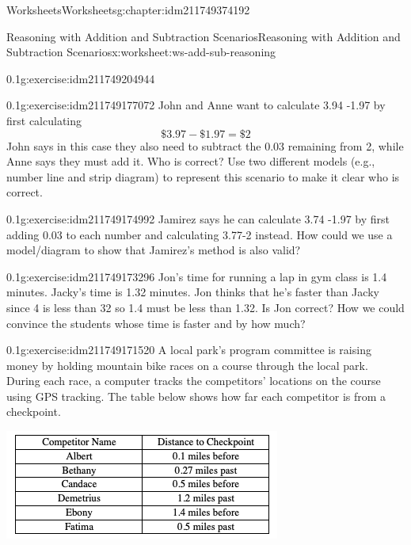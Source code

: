 \documentclass[twoside,11pt,]{book}
\begin{document}
\begin{chapterptx}{Worksheets}{}{Worksheets}{}{}{g:chapter:idm211749374192}
\begin{worksheet-section-numberless}{Reasoning with Addition and Subtraction Scenarios}{}{Reasoning with Addition and Subtraction Scenarios}{}{}{x:worksheet:ws-add-sub-reasoning}
\begin{divisionexercise}{1}{}{0.1}{g:exercise:idm211749204944}
\end{divisionexercise}%
\begin{divisionexercise}{2}{}{0.1}{g:exercise:idm211749177072}%
John and Anne want to calculate \textdollar{}3.94 -\textdollar{}1.97 by first calculating%
\begin{equation*}
\$3.97-\$1.97 = \$2 
\end{equation*}
John says in this case they also need to subtract the \textdollar{}0.03 remaining from \textdollar{}2, while Anne says they must add it.  Who is correct?  Use two different models (e.g., number line and strip diagram) to represent this scenario to make it clear who is correct.%
\end{divisionexercise}%
\begin{divisionexercise}{3}{}{0.1}{g:exercise:idm211749174992}%
Jamirez says he can calculate \textdollar{}3.74 -\textdollar{}1.97 by first adding \textdollar{}0.03 to each number and calculating \textdollar{}3.77-\textdollar{}2 instead.  How could we use a model\slash{}diagram to show that Jamirez’s method is also valid?%
\end{divisionexercise}%
\begin{divisionexercise}{4}{}{0.1}{g:exercise:idm211749173296}%
Jon’s time for running a lap in gym class is 1.4 minutes.  Jacky’s time is 1.32 minutes.  Jon thinks that he’s faster than Jacky since 4 is less than 32 so 1.4 must be less than 1.32.  Is Jon correct?  How we could convince the students whose time is faster and by how much?%
\end{divisionexercise}%
\begin{divisionexercise}{5}{}{0.1}{g:exercise:idm211749171520}%
A local park’s program committee is raising money by holding mountain bike races on a course through the local park.  During each race, a computer tracks the competitors’ locations on the course using GPS tracking.  The table below shows how far each competitor is from a checkpoint.%
\begin{sidebyside}{1}{0.05}{0.05}{0}%
\begin{sbspanel}{0.9}%
\includegraphics[width=1\linewidth]{images/reasoning-table-checkpoint.png}

\end{sbspanel}
\end{sidebyside}
\end{divisionexercise}
\end{worksheet-section-numberless}
\end{chapterptx}
\end{document}
